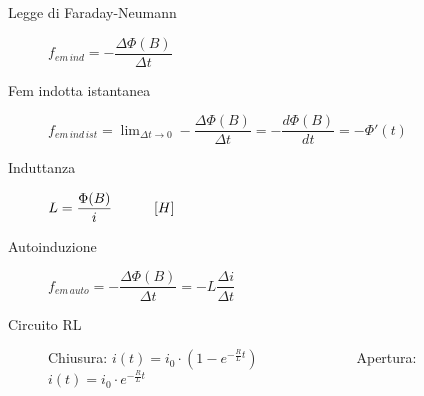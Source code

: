 \documentclass[a4paper,11pt,italian]{article}
\begin{document}
\begin{description}
  \item[Legge di Faraday-Neumann] 
  $ f_{em \, ind} =  - \dfrac{\Delta \Phi(B)}{\Delta t} $
  
  \item[Fem indotta istantanea] 
  $ f_{em \, ind \, ist} =  \displaystyle\lim_{\Delta t \rightarrow 0}- \dfrac{\Delta \Phi(B)}{\Delta t} = - \dfrac{d\Phi(B)}{dt} = - \Phi'(t) $
  
  
  \item[Induttanza] 
  $ L =  \dfrac{\Phi(B)}{i} \hspace*{3em} [H] $
  
  \item[Autoinduzione] 
  $ f_{em \, auto} =  - \dfrac{\Delta \Phi(B)}{\Delta t} = - L \dfrac{\Delta i}{\Delta t} $
  
  \item[Circuito RL] Chiusura: $ i(t) = i_0 \cdot \left( 1 - e^{-\frac{R}{L}t} \right) $~~~~~~~~~~~~~~Apertura: $ i(t) = i_0 \cdot e^{-\frac{R}{L}t} $

%

  

\end{description}
\end{document}
